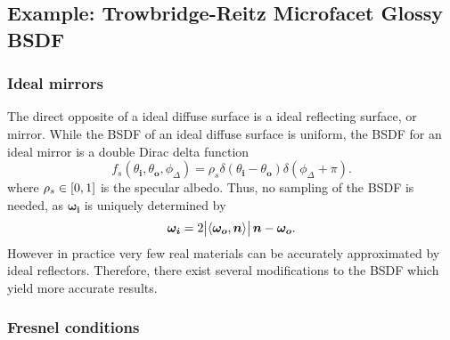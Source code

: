 \documentclass[12pt]{article}
\DeclarePairedDelimiter\ip{\langle }{\rangle}
\begin{document}
\subsection{Example: Trowbridge-Reitz Microfacet Glossy BSDF}

\subsubsection{Ideal mirrors}

The direct opposite of a ideal diffuse surface is a ideal reflecting surface, or mirror.
While the BSDF of an ideal diffuse surface is uniform, the BSDF for an ideal mirror is a double Dirac delta function
\[f_s(\theta_{\bm i}, \theta_{\bm o}, \phi_\Delta) = \rho_s \delta(\theta_{\bm i} - \theta_{\bm o})\delta(\phi_\Delta + \pi).\]
where \(\rho_s \in \intcc{0, 1}\) is the specular albedo.
Thus, no sampling of the BSDF is needed, as \(\bm{\omega_i}\) is uniquely determined by
\[\bm{\omega_i} = 2\abs{\ip{\bm{\omega_o}, \bm n}}\bm n-  \bm{\omega_o}.\]
However in practice very few real materials can be accurately approximated by ideal reflectors.
Therefore, there exist several modifications to the BSDF which yield more accurate results.

\subsubsection{Fresnel conditions}
\end{document}
